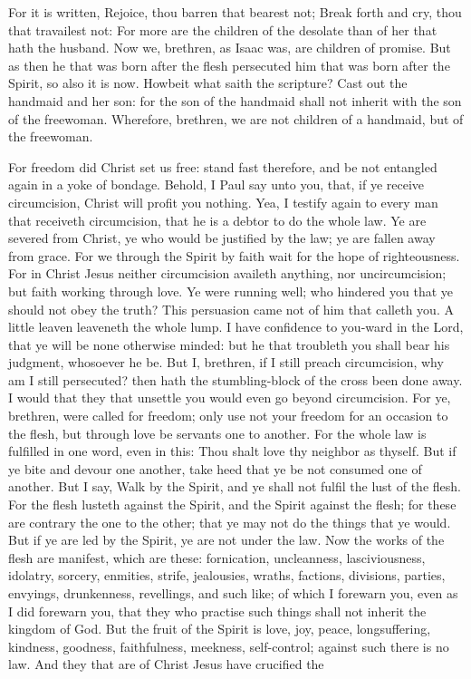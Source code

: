 For it is written, Rejoice, thou barren that bearest not; Break forth and cry, thou that travailest not: For more are the children of the desolate than of her that hath the husband.  Now we, brethren, as Isaac was, are children of promise. But as then he that was born after the flesh persecuted him that was born after the Spirit, so also it is now. Howbeit what saith the scripture? Cast out the handmaid and her son: for the son of the handmaid shall not inherit with the son of the freewoman. Wherefore, brethren, we are not children of a handmaid, but of the freewoman. 

For freedom did Christ set us free: stand fast therefore, and be not entangled again in a yoke of bondage.  Behold, I Paul say unto you, that, if ye receive circumcision, Christ will profit you nothing. Yea, I testify again to every man that receiveth circumcision, that he is a debtor to do the whole law. Ye are severed from Christ, ye who would be justified by the law; ye are fallen away from grace. For we through the Spirit by faith wait for the hope of righteousness. For in Christ Jesus neither circumcision availeth anything, nor uncircumcision; but faith working through love. Ye were running well; who hindered you that ye should not obey the truth? This persuasion came not of him that calleth you. A little leaven leaveneth the whole lump. I have confidence to you-ward in the Lord, that ye will be none otherwise minded: but he that troubleth you shall bear his judgment, whosoever he be. But I, brethren, if I still preach circumcision, why am I still persecuted? then hath the stumbling-block of the cross been done away. I would that they that unsettle you would even go beyond circumcision.  For ye, brethren, were called for freedom; only use not your freedom for an occasion to the flesh, but through love be servants one to another. For the whole law is fulfilled in one word, even in this: Thou shalt love thy neighbor as thyself. But if ye bite and devour one another, take heed that ye be not consumed one of another.  But I say, Walk by the Spirit, and ye shall not fulfil the lust of the flesh. For the flesh lusteth against the Spirit, and the Spirit against the flesh; for these are contrary the one to the other; that ye may not do the things that ye would. But if ye are led by the Spirit, ye are not under the law. Now the works of the flesh are manifest, which are these: fornication, uncleanness, lasciviousness, idolatry, sorcery, enmities, strife, jealousies, wraths, factions, divisions, parties, envyings, drunkenness, revellings, and such like; of which I forewarn you, even as I did forewarn you, that they who practise such things shall not inherit the kingdom of God. But the fruit of the Spirit is love, joy, peace, longsuffering, kindness, goodness, faithfulness, meekness, self-control; against such there is no law. And they that are of Christ Jesus have crucified the 